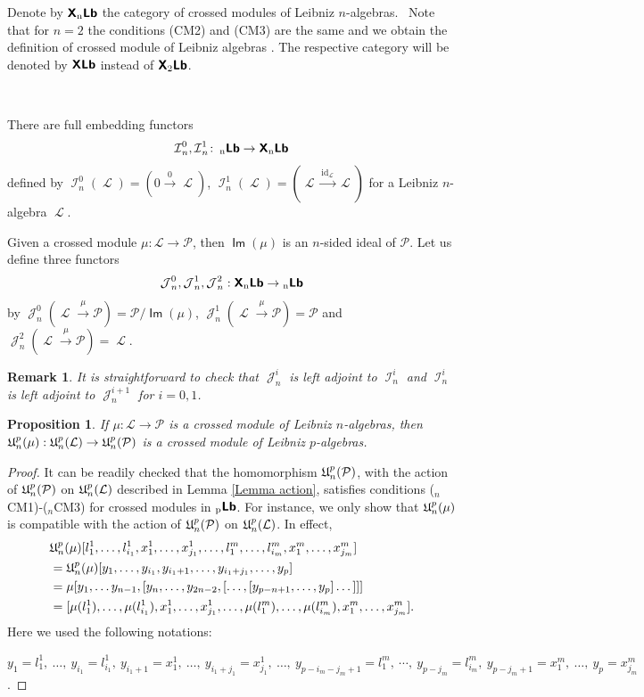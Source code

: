 \documentclass[12pt, reqno]{amsart}
\newtheorem{proposition}[definition]{Proposition}
\newtheorem{remark}[definition]{Remark}
\def\nLb{\operatorname{{}_{n}\textbf{\textsf{Lb}}}}
\def\pLb{\operatorname{{}_{p}\textbf{\textsf{Lb}}}}
\def\XLb{\operatorname{\textbf{\textsf{X}}\textbf{\textsf{Lb}}}}
\def\XnLb{\operatorname{\textbf{\textsf{X}}{}_{n}\textbf{\textsf{Lb}}}}
\def\X2Lb{\operatorname{\textbf{\textsf{X}}{}_{2}\textbf{\textsf{Lb}}}}
\def\U{\operatorname{\frak{U}}}
\def\ele{\operatorname{\mathcal{L}}}
\def\I{\operatorname{\mathcal{I}}}
\def\Up{\operatorname{\mathcal{J}}}
\def\id{\operatorname{id}}
\DeclareMathOperator{\Img}{\mathsf {Im}}
\begin{document}
Denote by ${\XnLb}$ the category of crossed modules of Leibniz $n$-algebras.
\
Note that for $n=2$ the conditions (CM2) and (CM3) are the same and we obtain the definition of crossed module of
Leibniz algebras \cite{LP}. The respective category will be denoted by $\XLb$ instead of ${\X2Lb}$.

\


There are full embedding functors
\[
\I_n^0, \I_n^1 \colon \nLb\to\XnLb
\]
defined by $\I_n^0(\ele)=(0\xrightarrow{ \ 0 \ } \ele)$, $\I_n^1(\ele)=(\ele\xrightarrow{\id_{\ele}} \ele)$
for a Leibniz $n$-algebra $\ele$.

Given a crossed module $\mu:\mathcal{L}\to \mathcal{P}$, then $\Img(\mu)$ is an $n$-sided ideal of $\mathcal{P}$. Let us define three functors
\[
\Up_n^0, \Up_n^1, \Up_n^2 : \XnLb \to \nLb
\]
by $\Up_n^0({\ele}\xrightarrow{\mu} \mathcal{P})=\mathcal{P}\slash \Img(\mu)$, $\Up_n^1({\ele}\xrightarrow{\mu} \mathcal{P})=\mathcal{P}$
 and $\Up_n^2({\ele}\xrightarrow{\mu} \mathcal{P})=\ele$.


\begin{remark}\label{remark_adj_Di_Lb}
	 It is straightforward to check that $\Up_n^i$ is left adjoint to $\I_n^i$ and $\I_n^i$ is left adjoint to
  $\Up_n^{i+1}$ for $i=0,1$.
\end{remark}


\begin{proposition}\label{Prop U preserves CM}
If $\mu:\mathcal{L}\to \mathcal{P}$ is a crossed module of Leibniz $n$-algebras, then ${\U}_n^p(\mu):{\U}_n^p(\mathcal{L})\to {\U}_n^p(\mathcal{P})$ is a crossed module of Leibniz $p$-algebras.
\end{proposition}
\begin{proof}
It can be readily checked that the homomorphism ${\U}_n^p(\mathcal{P})$, with the action of ${\U}_n^p(\mathcal{P})$ on ${\U}_n^p(\mathcal{L})$
described in Lemma \ref{Lemma action}, satisfies conditions (${}_n$CM1)-(${}_n$CM3) for crossed modules in $\pLb$. For instance, we only show that
${\U}_n^p(\mu)$ is compatible with the action of
${\U}_n^p(\mathcal{P})$ on ${\U}_n^p(\mathcal{L})$. In effect,
\begin{align*}
&{\U}_n^p(\mu)[l_1^1,\dots,l_{i_1}^1,x_1^1,\dots,x_{j_1}^1,\dots,l_1^m,\dots,l_{i_m}^m,x_1^m,\dots,x_{j_m}^m]\\
&={\U}_n^p(\mu) [y_1, \dots, y_{i_1}, y_{i_1 +1}, \dots, y_{i_1+j_1}, \dots,   y_{p}]  \\
 & = \mu[y_1, \dots y_{n-1},[y_n, \dots, y_{2n-2}, [\dots,[y_{p-n+1}, \dots, y_{p}] \dots]]]\\
&=[\mu(l_1^1),\dots,\mu(l_{i_1}^1),x_1^1,\dots,x_{j_1}^1,\dots,\mu(l_1^m),\dots,\mu(l_{i_m}^m),x_1^m,\dots,x_{j_m}^m].
\end{align*}
Here we used the following notations:

\noindent $y_1=l_1^1, \ \dots,\ y_{i_1}=l_{i_1}^1, \ y_{i_1+1}=x_1^1, \ \dots, \ y_{i_1+j_1} = x_{j_1}^1, \ \dots, \ y_{p-i_m-j_m+1}=l_{1}^m, \ \cdots, \ y_{p-j_m}=l_{i_m}^m, \  y_{p-j_m+1}=x_{1}^m, \ \dots, \  y_{p}=x_{j_m}^m$.
\end{proof}
\end{document}
